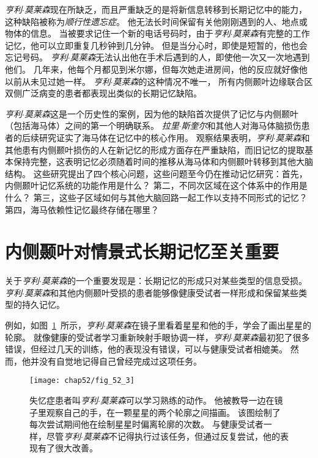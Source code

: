 \textit{亨利$\cdot$莫莱森}现在所缺乏，而且严重缺乏的是将新信息转移到长期记忆中的能力，这种缺陷被称为\textit{顺行性遗忘症}。
他无法长时间保留有关他刚刚遇到的人、地点或物体的信息。
当被要求记住一个新的电话号码时，由于\textit{亨利$\cdot$莫莱森}有完整的工作记忆，他可以立即重复几秒钟到几分钟。
但是当分心时，即使是短暂的，他也会忘记号码。
\textit{亨利$\cdot$莫莱森}无法认出他在手术后遇到的人，即使他一次又一次地遇到他们。
几年来，他每个月都见到米尔娜，但每次她走进房间，他的反应就好像他以前从未见过她一样。
\textit{亨利$\cdot$莫莱森}的这种情况不唯一，
所有内侧颞叶边缘联合区双侧广泛病变的患者都表现出类似的长期记忆缺陷。


\textit{亨利$\cdot$莫莱森}这是一个历史性的案例，因为他的缺陷首次提供了记忆与内侧颞叶（包括海马体）之间的第一个明确联系。
\textit{拉里$\cdot$斯奎尔}和其他人对海马体脑损伤患者的后续研究证实了海马体在记忆中的核心作用。
观察结果表明，\textit{亨利$\cdot$莫莱森}和其他患有内侧颞叶损伤的人在新记忆的形成方面存在严重缺陷，而旧记忆的提取基本保持完整，这表明记忆必须随着时间的推移从海马体和内侧颞叶转移到其他大脑结构。
这些研究提出了四个核心问题，这些问题至今仍在推动记忆研究：首先，内侧颞叶记忆系统的功能作用是什么？
第二，不同次区域在这个体系中的作用是什么？
第三，这些子区域如何与其他大脑回路一起工作以支持不同形式的记忆？
第四，海马依赖性记忆最终存储在哪里？



\section{内侧颞叶对情景式长期记忆至关重要}

关于\textit{亨利$\cdot$莫莱森}的一个重要发现是：长期记忆的形成只对某些类型的信息受损。
\textit{亨利$\cdot$莫莱森}和其他内侧颞叶受损的患者能够像健康受试者一样形成和保留某些类型的持久记忆。


例如，如图~\ref{fig:52_3}~所示，\textit{亨利$\cdot$莫莱森}在镜子里看着星星和他的手，学会了画出星星的轮廓。
就像健康的受试者学习重新映射手眼协调一样，\textit{亨利$\cdot$莫莱森}最初犯了很多错误，但经过几天的训练，他的表现没有错误，可以与健康受试者相媲美。
然而，他并没有自觉地记得自己曾经完成过这项任务。


\begin{figure}[htbp]
	\centering
	\texttt{[image: chap52/fig\_52\_3]}
	\caption{失忆症患者叫\textit{亨利$\cdot$莫莱森}可以学习熟练的动作。
		他被教导一边在镜子里观察自己的手，在一颗星星的两个轮廓之间描画。
		该图绘制了每次尝试期间他在绘制星星时偏离轮廓的次数。
		与健康受试者一样，尽管\textit{亨利$\cdot$莫莱森}不记得执行过该任务，但通过反复尝试，他的表现有了很大改善\cite{blakemore1977mechanics}。}
	\label{fig:52_3}
\end{figure}


